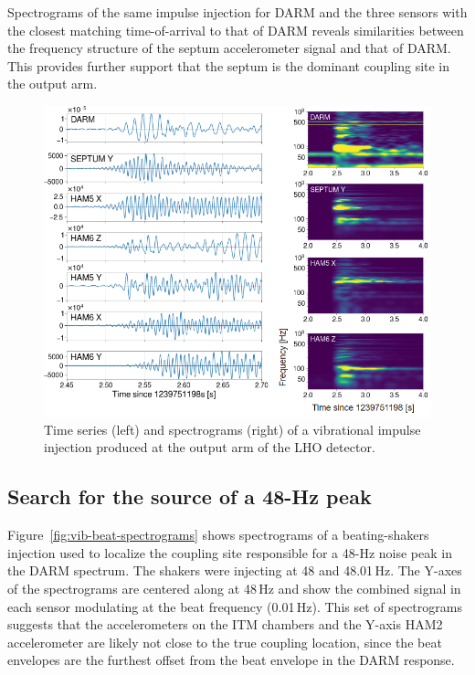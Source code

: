 Spectrograms of the same impulse injection for \ac{DARM} and the three sensors with the closest matching time-of-arrival to that of \ac{DARM} reveals similarities between the frequency structure of the septum accelerometer signal and that of \ac{DARM}.
This provides further support that the septum is the dominant coupling site in the output arm.

\begin{figure}[h!]
	\centering
	\includegraphics[width=\textwidth]{figures/noise-studies/vib-impulse.png}
	\caption{
		Time series (left) and spectrograms (right) of a vibrational impulse injection produced at the output arm of the LHO detector.}
	\label{fig:vib-impulse}
\end{figure}



\subsection{Search for the source of a 48-Hz peak}\label{sec:vib-48hz}

Figure~\ref{fig:vib-beat-spectrograms} shows spectrograms of a beating-shakers injection used to localize the coupling site responsible for a 48\hyp Hz noise peak in the \ac{DARM} spectrum.
The shakers were injecting at 48 and 48.01\,Hz. The Y-axes of the spectrograms are centered along at 48\,Hz and show the combined signal in each sensor modulating at the beat frequency (0.01\,Hz).
This set of spectrograms suggests that the accelerometers on the \ac{ITM} chambers and the Y-axis HAM2 accelerometer are likely not close to the true coupling location, since the beat envelopes are the furthest offset from the beat envelope in the \ac{DARM} response.

